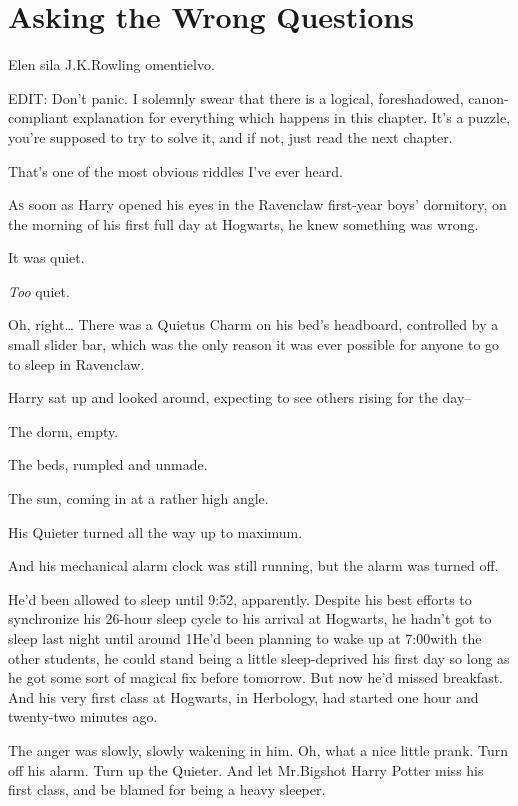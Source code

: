 \chapter{Asking the Wrong Questions}

\begin{chapterOpeningAuthorNote}
Elen sila J.\?K.\?Rowling omentielvo.

EDIT: Don't panic. I solemnly swear that there is a logical, foreshadowed, canon-compliant explanation for everything which happens in this chapter. It's a puzzle, you're supposed to try to solve it, and if not, just read the next chapter.
\end{chapterOpeningAuthorNote}
\begin{chapterOpeningQuote}
That's one of the most obvious riddles I've ever heard.
\end{chapterOpeningQuote}

\lettrine{A}{s} soon as Harry opened his eyes in the Ravenclaw first-year boys' dormitory, on the morning of his first full day at Hogwarts, he knew something was wrong.

It was quiet.

\emph{Too} quiet.

Oh, right{\ldots} There was a Quietus Charm on his bed's headboard, controlled by a small slider bar, which was the only reason it was ever possible for anyone to go to sleep in Ravenclaw.

Harry sat up and looked around, expecting to see others rising for the day\---

The dorm, empty.

The beds, rumpled and unmade.

The sun, coming in at a rather high angle.

His Quieter turned all the way up to maximum.

And his mechanical alarm clock was still running, but the alarm was turned off.

He'd been allowed to sleep until 9:52\am, apparently. Despite his best efforts to synchronize his 26-hour sleep cycle to his arrival at Hogwarts, he hadn't got to sleep last night until around 1\am He'd been planning to wake up at 7:00\am with the other students, he could stand being a little sleep-deprived his first day so long as he got some sort of magical fix before tomorrow. But now he'd missed breakfast. And his very first class at Hogwarts, in Herbology, had started one hour and twenty-two minutes ago.

The anger was slowly, slowly wakening in him. Oh, what a nice little prank. Turn off his alarm. Turn up the Quieter. And let Mr.\?Bigshot Harry Potter miss his first class, and be blamed for being a heavy sleeper.

